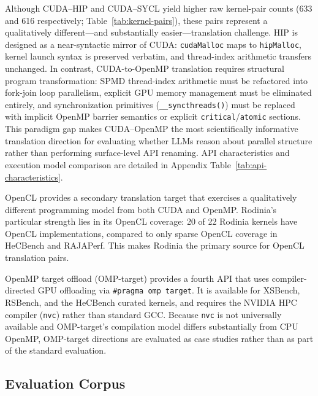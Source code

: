 \documentclass[conference]{IEEEtran}
\begin{document}
Although CUDA--HIP and CUDA--SYCL yield higher raw kernel-pair counts (633 and 616 respectively; Table~\ref{tab:kernel-pairs}), these pairs represent a qualitatively different---and substantially easier---translation challenge. HIP is designed as a near-syntactic mirror of CUDA: \texttt{cudaMalloc} maps to \texttt{hipMalloc}, kernel launch syntax is preserved verbatim, and thread-index arithmetic transfers unchanged. In contrast, CUDA-to-OpenMP translation requires structural program transformation: SPMD thread-index arithmetic must be refactored into fork-join loop parallelism, explicit GPU memory management must be eliminated entirely, and synchronization primitives (\texttt{\_\_syncthreads()}) must be replaced with implicit OpenMP barrier semantics or explicit \texttt{critical}/\texttt{atomic} sections. This paradigm gap makes CUDA--OpenMP the most scientifically informative translation direction for evaluating whether LLMs reason about parallel structure rather than performing surface-level API renaming.
API characteristics and execution model comparison are detailed in Appendix Table~\ref{tab:api-characteristics}.


OpenCL provides a secondary translation target that exercises a qualitatively different programming model from both CUDA and OpenMP. Rodinia's particular strength lies in its OpenCL coverage: 20 of 22 Rodinia kernels have OpenCL implementations, compared to only sparse OpenCL coverage in HeCBench and RAJAPerf. This makes Rodinia the primary source for OpenCL translation pairs.

OpenMP target offload (OMP-target) provides a fourth API that uses compiler-directed GPU offloading via \texttt{\#pragma omp target}. It is available for XSBench, RSBench, and the HeCBench curated kernels, and requires the NVIDIA HPC compiler (\texttt{nvc}) rather than standard GCC. Because \texttt{nvc} is not universally available and OMP-target's compilation model differs substantially from CPU OpenMP, OMP-target directions are evaluated as case studies rather than as part of the standard evaluation.

\subsection{Evaluation Corpus}
\label{sec:eval-corpus}
\end{document}
